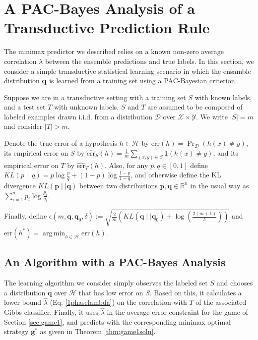 \documentclass{article}[12pt]
\theoremstyle{named}
\newcommand{\vg}{\mathbf{g}}    %
\newcommand{\vp}{\mathbf{p}}
\newcommand{\vq}{\mathbf{q}}
\DeclareMathOperator*{\argmin}{arg\,min}
\DeclareMathOperator{\Prtxt}{Pr}
\newcommand{\RR}{\mathbb{R}}      %
\newcommand{\ifn}{\mathbf{1}} %
\newcommand{\abs}[1]{\left| #1 \right|}
\newcommand{\prp}[2]{\Prtxt_{#2} \left(#1\right)}
\newcommand{\err}[1]{\mbox{err}\left(#1\right)}
\newcommand{\emperr}[2]{\widehat{\mbox{err}}_{#2} \left(#1\right)}
\newcommand{\cH}{\mathcal{H}}
\newcommand{\cX}{\mathcal{X}}
\newcommand{\cY}{\mathcal{Y}}
\newcommand{\cD}{\mathcal{D}}
\newcommand{\lrp}[1]{\left(#1\right)}
\begin{document}
\section{A PAC-Bayes Analysis of a Transductive Prediction Rule}
\label{sec:pbanalysis}

The minimax predictor we described relies on a known non-zero average
correlation $\lambda$ between the ensemble predictions and true
labels.  In this section, we consider a simple transductive
statistical learning scenario in which the ensamble distribution ${\bf
  q}$ is learned from a training set using a PAC-Bayesian
criterion.~\cite{}

Suppose we are in a transductive setting with a training set $S$ with known labels, 
and a test set $T$ with unknown labels. 
$S$ and $T$ are assumed to be composed of labeled examples drawn i.i.d. from a distribution $\cD$ over $\cX \times \cY$. 
We write $\abs{S} = m$ and consider $\abs{T} > m$. 

Denote the true error of a hypothesis $h \in \cH$ by $\err{h} = \prp{h(x) \neq y}{\cD}$, 
its empirical error on $S$ by $\emperr{h}{S} = \frac{1}{m} \sum_{(x,y) \in S} \ifn(h(x) \neq y)$, 
and its empirical error on $T$ by $\emperr{h}{T}$. 
Also, for any $p,q \in [0,1]$ define $KL\lrp{ p \mid \mid q } = p \log \frac{p}{q} + (1-p) \log \frac{1-p}{1-q}$, 
and otherwise define the KL divergence $KL\lrp{ \vp \mid \mid \vq }$ between two distributions $\vp, \vq \in \RR^n$ in the usual way as
$\sum_{i=1}^n p_i \log \frac{p_i}{q_i}$.

Finally, define $ \epsilon (m, \vq, \vq_0, \delta) := \sqrt{ \frac{2}{m} \lrp{ KL (\vq \mid \mid \vq_0) + \log\lrp{\frac{2(m+1)}{\delta}} } }$ 
and $\err{h^*} = \argmin_{h \in \cH} \err{h}$.



\subsection{An Algorithm with a PAC-Bayes Analysis}
\label{sec:pbalgbasic}

The learning algorithm we consider simply observes the labeled set $S$ 
and chooses a distribution $\vq$ over $\cH$ that has low error on $S$. 
Based on this, it calculates a lower bound $\hat{\lambda}$ (Eq. \eqref{1phaselambda})
 on the correlation with $T$ of the associated Gibbs classifier.  
Finally, it uses $\hat{\lambda}$ in the average error constraint for the game of Section \ref{sec:game1}, 
and predicts with the corresponding minimax optimal strategy $\vg^*$ as given in Theorem \ref{thm:game1soln}.
\end{document}
